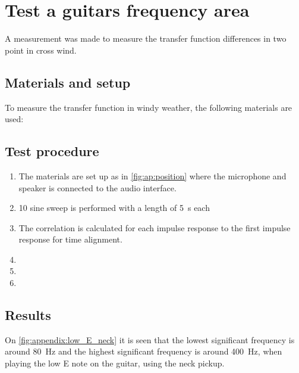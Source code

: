 \chapter{Test a guitars frequency area}
A measurement was made to measure the transfer function differences in two point in cross wind.


\section*{Materials and setup}
To measure the transfer function in windy weather, the following materials are used:

\startequipment
{}
\stopequipment


\section*{Test procedure}


\begin{enumerate}
\item The materials are set up as in \autoref{fig:ap:position} where the microphone and speaker is connected to the audio interface.
\item 10 sine sweep is performed with a length of \SI{5}{\second} each 
\item  The correlation is calculated for each impulse response to the first impulse response for time alignment.  
\item  
\item 
\item 
\end{enumerate}

\section*{Results}




On  \autoref{fig:appendix:low_E_neck} it is seen that the lowest significant frequency is around \SI{80}{\hertz} and the highest significant frequency is around \SI{400}{\hertz}, when playing the low E note on the guitar, using the neck pickup.

